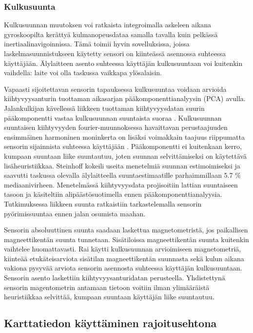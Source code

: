 \subsubsection{Kulkusuunta}

Kulkusuunnan muutoksen voi ratkaista integroimalla askeleen aikana
gyroskoopilta kerättyä kulmanopeusdataa samalla tavalla kuin pelkässä
inertiaalinavigoinnissa. Tämä toimii hyvin sovelluksissa, joissa
laskelmasuunnistukseen käytetty sensori on kiinteässä asennossa suhteessa
käyttäjään. Älylaitteen asento suhteessa käyttäjän kulkusuuntaan voi
kuitenkin vaihdella: laite voi olla taskussa vaikkapa ylösalaisin.

Vapaasti sijoitettavan sensorin tapauksessa kulkusuuntaa voidaan arvioida
kiihtyvyysanturin tuottaman aikasarjan pääkomponenttianalyysin (PCA) avulla.
Jalankulkijan kävellessä liikkeen tuottaman kiihtyvyysdatan suurin
pääkomponentti vastaa kulkusuunnan suuntaista suoraa \cite{steinhoff2010}.
Kulkusuunnan suuntaisen kiihtyvyyden fourier-muunnoksessa havaittavan
perustaajuuden ensimmäinen harmoninen moninkerta on lisäksi voimakkain
taajuus riippumatta sensorin sijainnista suhteessa käyttäjään
\cite{rai2012}.
Pääkomponentti ei
kuitenkaan kerro, kumpaan suuntaan liike suuntautuu, joten suunnan
selvittämiseksi on käytettävä lisäheuristiikkaa. Steinhoff
\cite{steinhoff2010} kokeili useita menetelmiä suunnan estimoimiseksi
ja saavutti taskussa olevalla älylaitteella suuntaestimaatille parhaimmillaan
5.7 \% mediaanivirheen. Menetelmässä kiihtyvyysdata projisoitiin lattian
suuntaiseen tasoon ja käsiteltiin alipäästösuotimella ennen
pääkomponenttianalyysia. Tutkimuksessa liikkeen suunta ratkaistiin
tarkastelemalla sensorin pyörimissuuntaa ennen jalan osumista maahan.

Sensorin absoluuttinen suunta saadaan laskettua magnetometristä, jos paikallisen
magneettikentän suunta tunnetaan. Sisätiloissa magneettikentän suunta
kuitenkin vaihtelee huomattavasti. Rai \cite{rai2012} käytti kulkusuunnan
arvioimiseen magnetometriä, kiinteää etukäteisarviota sisätilan
magneettikentän suunnasta sekä kulun aikana vakiona pysyvää arviota
sensorin asennosta suhteessa käyttäjän kulkusuuntaan. Sensorin asento
laskettiin kiihtyvyysanturidatan perusteella. Yhdistettynä sensorin
magentometrin antamaan tietoon voitiin ilman ylimääräistä
heuristiikkaa selvittää, kumpaan suuntaan käyttäjän
liike suuntautuu.

\subsection{Karttatiedon käyttäminen rajoitusehtona}

